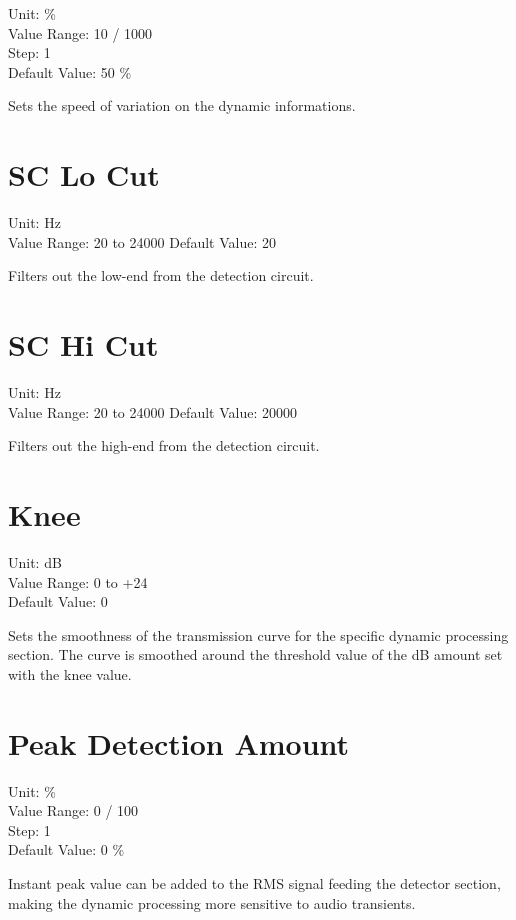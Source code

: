 \documentclass[
  letterpaper,
  DIV=11,
  numbers=noendperiod]{scrreport}
\begin{document}
Unit: \%\\
Value Range: 10 / 1000\\
Step: 1\\
Default Value: 50 \%

Sets the speed of variation on the dynamic informations.

\hypertarget{sc-lo-cut}{%
\section{SC Lo Cut}\label{sc-lo-cut}}

Unit: Hz\\
Value Range: 20 to 24000 Default Value: 20

Filters out the low-end from the detection circuit.

\hypertarget{sc-hi-cut}{%
\section{SC Hi Cut}\label{sc-hi-cut}}

Unit: Hz\\
Value Range: 20 to 24000 Default Value: 20000

Filters out the high-end from the detection circuit.

\hypertarget{knee}{%
\section{Knee}\label{knee}}

Unit: dB\\
Value Range: 0 to +24\\
Default Value: 0

Sets the smoothness of the transmission curve for the specific dynamic
processing section. The curve is smoothed around the threshold value of
the dB amount set with the knee value.

\hypertarget{peak-detection-amount}{%
\section{Peak Detection Amount}\label{peak-detection-amount}}

Unit: \%\\
Value Range: 0 / 100\\
Step: 1\\
Default Value: 0 \%

Instant peak value can be added to the RMS signal feeding the detector
section, making the dynamic processing more sensitive to audio
transients.
\end{document}
